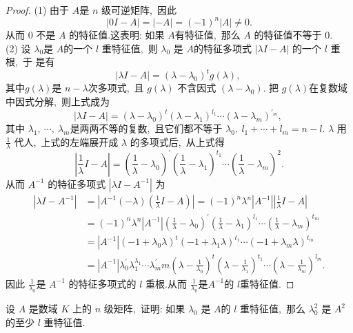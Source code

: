 \begin{proof}
	(1) 由于 $ A  $是 $ n$  级可逆矩阵,\  因此
	$$|0 I-A|=|-A|=(-1)^{n}|A| \neq 0 .$$
	从而 $0$ 不是 $ A$  的特征值.这表明: 如果 $ A  $有特征值,\  那么 $ A $ 的特征值不等于 0.\\
	(2) 设 $ \lambda_{0}  $是 $ A  $的一个 $ l$  重特征值,\  则 $ \lambda_{0}$  是 $ A  $的特征多项式 $ |\lambda I-A| $ 的一个  $l$  重根,\  于 是有
	$$|\lambda I-A|=\left(\lambda-\lambda_{0}\right)^{t} g(\lambda),\ $$
	其中$  g(\lambda)  $是 $ n-\lambda  $次多项式,\  且 $ g(\lambda)$  不含因式  $\left(\lambda-\lambda_{0}\right) .$
	把 $ g(\lambda)  $在复数域中因式分解,\  则上式成为
	$$|\lambda I-A|=\left(\lambda-\lambda_{0}\right)^{t}\left(\lambda-\lambda_{1}\right)^{l_{1}} \cdots\left(\lambda-\lambda_{m}\right)^{\prime_{m}},\ $$
	其中  $\lambda_{1},\  \cdots,\  \lambda_{m}  $是两两不等的复数,\  且它们都不等于  $\lambda_{0},\  l_{1}+\cdots+l_{m}=n-l. $
	$\lambda $ 用  $\frac{1}{\lambda} $ 代人,\ 上式的左端展开成  $\lambda $ 的多项式后,\  从上式得
	$$\left|\frac{1}{\lambda} I-A\right|=\left(\frac{1}{\lambda}-\lambda_{0}\right)^{\prime}\left(\frac{1}{\lambda}-\lambda_{1}\right)^{t_{1}} \cdots\left(\frac{1}{\lambda}-\lambda_{m}\right)^{2} .$$
	从而 $ A^{-1}$  的特征多项式 $ \left|\lambda I-A^{-1}\right| $ 为
	$$\begin{aligned}
		\left|\lambda I-A^{-1}\right| & =\left|A^{-1}(-\lambda)\left(\frac{1}{\lambda} I-A\right)\right|=(-1)^{n} \lambda^{n}\left|A^{-1}\right|\left|\frac{1}{\lambda} I-A\right| \\
		& =(-1)^{n} \lambda^{n}\left|A^{-1}\right|\left(\frac{1}{\lambda}-\lambda_{0}\right)^{\prime}\left(\frac{1}{\lambda}-\lambda_{1}\right)^{l_{1}} \cdots\left(\frac{1}{\lambda}-\lambda_{m}\right)^{t_{m}} \\
		& =\left|A^{-1}\right|\left(-1+\lambda_{0} \lambda\right)^{t}\left(-1+\lambda_{1} \lambda\right)^{t_{1}} \cdots\left(-1+\lambda_{m} \lambda\right)^{t_{m}} \\
		& =\left|A^{-1}\right| \lambda_{0}^{\prime} \lambda_{1}^{\lambda_{1}} \cdots \lambda_{m}^{\prime} m\left(\lambda-\frac{1}{\lambda_{0}}\right)^{t}\left(\lambda-\frac{1}{\lambda_{1}}\right)^{t_{1}} \cdots\left(\lambda-\frac{1}{\lambda_{m}}\right)^{l_{m}} .
	\end{aligned}$$
	因此 $ \frac{1}{\lambda_{0}}  $是 $ A^{-1} $ 的特征多项式的  $l$  重根.从而  $\frac{1}{\lambda_{0}}  $是$  A^{-1}  $的  $l  $重特征值.
\end{proof}
\newpage
\begin{problem}
	设  $A $ 是数域 $ K$  上的 $ n $ 级矩阵,\  证明: 如果  $\lambda_{0} $ 是 $ A  $的  $l $ 重特征值,\  那么  $\lambda_{0}^{2}$  是 $ A^{2} $ 的至少  $l $ 重特征值.
\end{problem}
